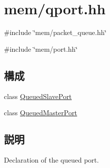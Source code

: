 \hypertarget{qport_8hh}{
\section{mem/qport.hh}
\label{qport_8hh}
}
{\ttfamily \#include \char`\"{}mem/packet\_\-queue.hh\char`\"{}}\par
{\ttfamily \#include \char`\"{}mem/port.hh\char`\"{}}\par
\subsection*{構成}
\begin{DoxyCompactItemize}
\item 
class \hyperlink{classQueuedSlavePort}{QueuedSlavePort}
\item 
class \hyperlink{classQueuedMasterPort}{QueuedMasterPort}
\end{DoxyCompactItemize}


\subsection{説明}
Declaration of the queued port. 